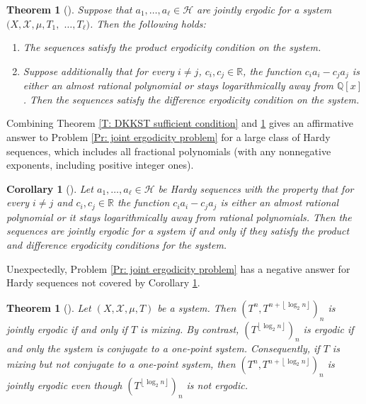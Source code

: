 \documentclass[11pt]{amsart}
\newtheorem{theorem}[lemma]{Theorem}
\newtheorem{corollary}[lemma]{Corollary}
\theoremstyle{definition}
\newcommand{\Q}{{\mathbb Q}}
\newcommand{\R}{{\mathbb R}}
\newcommand{\CH}{{\mathcal H}}
\newcommand{\CX}{{\mathcal X}}
\newcommand{\1}{{\mathbf{1}}}
\newcommand{\floor}[1]{{\left \lfloor #1 \right \rfloor}}
\begin{document}
\begin{theorem}[{\cite[Theorem 1.7]{DKKST25}}]\label{T: DKKST partial converse}
        Suppose that $a_{1},\dots,a_{\ell}\in\mathcal{H}$ are jointly ergodic for a system $(X, \CX, \mu, T_1, $ $ \ldots, T_\ell)$. Then the following holds:
        \begin{enumerate}
            \item The sequences satisfy the product ergodicity condition on the system.
            \item Suppose additionally that for every $i\neq j$, $c_i, c_j\in\R$, the function $c_i a_i - c_j a_j$ is either an almost rational polynomial  or stays logarithmically away from $\Q[x]$. Then the sequences satisfy the difference ergodicity condition on the system.
        \end{enumerate}
\end{theorem}

Combining Theorem \ref{T: DKKST sufficient condition} and \ref{T: DKKST partial converse} gives an affirmative answer to Problem \ref{Pr: joint ergodicity problem} for a large class of Hardy sequences, which includes all fractional polynomials (with any nonnegative exponents, including positive integer ones).
\begin{corollary}[{\cite[Corollary 1.8]{DKKST25}}]\label{C: DKKST classification}
    Let $a_1, \ldots, a_\ell\in\CH$ be Hardy sequences with the property that for every $i\neq j$ and $c_i, c_j\in\R$ the function $c_i a_i - c_j a_j$ is either an almost rational polynomial or it stays logarithmically away from rational polynomials.    
    Then the sequences are jointly ergodic for a system if and only  if they satisfy the product and difference ergodicity conditions for the system. 
\end{corollary}

Unexpectedly, Problem \ref{Pr: joint ergodicity problem} has a negative answer for Hardy sequences not covered by Corollary \ref{C: DKKST classification}. 
\begin{theorem}[{\cite[Theorem 1.10]{DKKST25}}]\label{T: DKKST counterexample to classification problem}
    Let $(X, \CX, \mu, T)$ be a system. Then $(T^n, T^{n+\floor{\log_2 n}})_n$ is jointly ergodic if and only if $T$ is mixing. By contrast, $(T^{\floor{\log_2 n}})_n$ is ergodic if and only the system is conjugate to a one-point system. Consequently, if $T$ is mixing but not conjugate to a one-point system, then $(T^n, T^{n+\floor{\log_2 n}})_n$ is jointly ergodic even though $(T^{\floor{\log_2 n}})_n$ is not ergodic.
\end{theorem}
\end{document}
